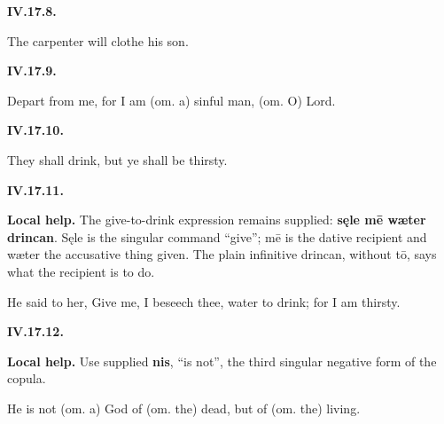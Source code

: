 \par\begin{minipage}{\linewidth}\raggedright
\textbf{IV.17.8.}

The carpenter will clothe his son.

\end{minipage}\par\addvspace{4pt}

\par\begin{minipage}{\linewidth}\raggedright
\textbf{IV.17.9.}

Depart from me, for I am (om. a) sinful man, (om. O) Lord.

\end{minipage}\par\addvspace{4pt}

\par\begin{minipage}{\linewidth}\raggedright
\textbf{IV.17.10.}

They shall drink, but ye shall be thirsty.

\end{minipage}\par\addvspace{4pt}

\par\begin{minipage}{\linewidth}\raggedright
\textbf{IV.17.11.}

\textbf{Local help.} The give-to-drink expression remains supplied: \textbf{sęle mē wæter drincan}. Sęle is the singular command “give”; mē is the dative recipient and wæter the accusative thing given. The plain infinitive drincan, without tō, says what the recipient is to do.

He said to her, Give me, I beseech thee, water to drink; for I am thirsty.

\end{minipage}\par\addvspace{4pt}

\par\begin{minipage}{\linewidth}\raggedright
\textbf{IV.17.12.}

\textbf{Local help.} Use supplied \textbf{nis}, “is not”, the third singular negative form of the copula.

He is not (om. a) God of (om. the) dead, but of (om. the) living.

\end{minipage}\par\addvspace{4pt}

